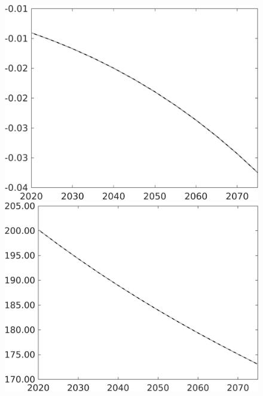 \begin{figure}[h!!]
\begin{minipage}[]{0.32\textwidth}
	\includegraphics[width=1\textwidth]{../../codding_model/own_basedOnFried/optimalPol_010922_revision/figures/all_13Sept22/PerdifNoTauf_regime0_CompTaul_snS_spillover0_nsk0_xgr0_knspil0_sep0_LFlimit0_emsbase0_countec0_GovRev0_etaa0.79_lgd0.png}
\end{minipage}
\begin{minipage}[]{0.32\textwidth}
\includegraphics[width=1\textwidth]{../../codding_model/own_basedOnFried/optimalPol_010922_revision/figures/all_13Sept22/PerdifNoTauf_regime0_CompTaul_GFF_spillover0_nsk0_xgr0_knspil0_sep0_LFlimit0_emsbase0_countec0_GovRev0_etaa0.79_lgd0.png}

\end{minipage}
\end{figure}
